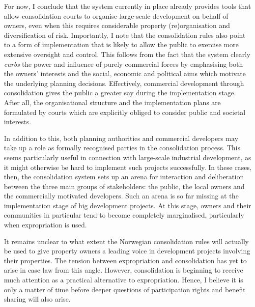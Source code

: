
For now, I conclude that the system currently in place already provides tools that allow consolidation courts to organise large-scale development on behalf of owners, even when this requires considerable property (re)organisation and diversification of risk. Importantly, I note that the consolidation rules also point to a form of implementation that is likely to allow the public to exercise more extensive oversight and control. This follows from the fact that the system clearly \emph{curbs} the power and influence of purely commercial forces by emphasising both the owners' interests and the social, economic and political aims which motivate the underlying planning decisions. Effectively, commercial development through consolidation gives the public a greater say during the implementation stage. After all, the organisational structure and the implementation plans are formulated by courts which are explicitly obliged to consider public and societal interests.

In addition to this, both planning authorities and commercial developers may take up a role as formally recognised parties in the consolidation process. This seems particularly useful in connection with large-scale industrial development, as it might otherwise be hard to implement such projects successfully. In these cases, then, the consolidation system sets up an arena for interaction and deliberation between the three main groups of stakeholders: the public, the local owners and the commercially motivated developers. Such an arena is so far missing at the implementation stage of big development projects. At this stage, owners and their communities in particular tend to become completely marginalised, particularly when expropriation is used.

It remains unclear to what extent the Norwegian consolidation rules will actually be used to give property owners a leading voice in development projects involving their properties. The tension between expropriation and consolidation has yet to arise in case law from this angle. However, consolidation is beginning to receive much attention as a practical alternative to expropriation. Hence, I believe it is only a matter of time before deeper questions of participation rights and benefit sharing will also arise.


